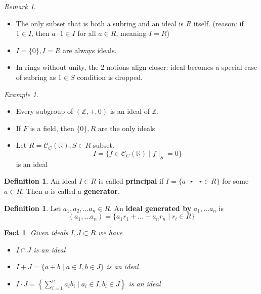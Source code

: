 \documentclass{amsart}
\newcommand{\RR}{\mathbb{R}}
\newcommand{\ZZ}{\mathbb{Z}}
\newtheorem{fact}[thm]{Fact}
\theoremstyle{definition}
\newtheorem{defn}[thm]{Definition}
\theoremstyle{remark}
\newtheorem*{rmk}{Remark}
\newtheorem*{ex}{Example}
\begin{document}
\begin{rmk}\hspace{0.5cm}
    \begin{itemize}
        \item The only subset that is both a subring and an ideal is $R$ itself.
        (reason: if $1 \in I$, then $a \cdot 1 \in I$ for all $a \in R$, meaning $I = R$)
        \item $I = \{0\}, I = R$ are always ideals.
        \item In rings without unity, the 2 notions align closer: ideal becomes a special
        case of subring as $1 \in S$ condition is dropped.
    \end{itemize}
\end{rmk}
\begin{ex} \hspace{0.5cm}
    \begin{itemize}
        \item Every subgroup of $(\ZZ, +, 0)$ is an ideal of $\ZZ$.
        \item If $F$ is a field, then $\{0\}, R$ are the only ideals
        \item Let $R = \mathcal{C}_C(\RR), S \in R$ subset.
        $$
        I = \{f \in \mathcal{C}_C(\RR) \mid f \mid_{S} = 0 \}
        $$
        is an ideal
    \end{itemize}
\end{ex}
\begin{defn}
    An ideal $I \in R$ is called \textbf{principal} if $I = \{a \cdot r \mid r \in R\}$
    for some $a \in R$. Then $a$ is called a \textbf{generator}.
\end{defn}
\begin{defn}
    Let $a_1, a_2, \dots a_n \in R$. An \textbf{ideal generated by} $a_1, \dots a_n$ is
    $$
    (a_1, \dots a_n) = \{a_1r_1 + \dots + a_nr_n \mid r_i \in R\}
    $$
\end{defn}
\begin{fact}
    Given ideals $I, J \subset R$ we have
    \begin{itemize}
        \item $I \cap J$ is an ideal
        \item $I + J = \{a + b \mid a \in I, b \in J \}$ is an ideal
        \item $I \cdot J = \left\{\sum\limits_{i = 1}^{n}a_ib_i \mid a_i \in I, b_i \in J \right\}$ is an ideal
    \end{itemize}
\end{fact}
\end{document}
